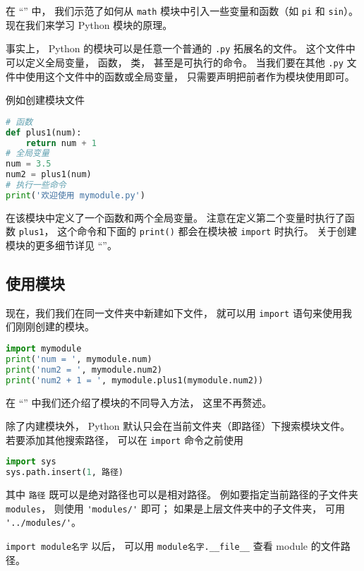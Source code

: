 

在 “” 中， 我们示范了如何从 \verb`math` 模块中引入一些变量和函数（如 \verb`pi` 和 \verb`sin`）。 现在我们来学习 Python 模块的原理。

事实上， Python 的模块可以是任意一个普通的 \verb`.py` 拓展名的文件。 这个文件中可以定义全局变量， 函数， 类， 甚至是可执行的命令。 当我们要在其他 \verb`.py` 文件中使用这个文件中的函数或全局变量， 只需要声明把前者作为模块使用即可。

例如创建模块文件
\begin{lstlisting}[language=python,caption=mymodule.py]
# 函数
def plus1(num):
    return num + 1
# 全局变量
num = 3.5
num2 = plus1(num)
# 执行一些命令
print('欢迎使用 mymodule.py')
\end{lstlisting}
在该模块中定义了一个函数和两个全局变量。 注意在定义第二个变量时执行了函数 \verb`plus1`， 这个命令和下面的 \verb`print()` 都会在模块被 \verb`import` 时执行。 关于创建模块的更多细节详见 “”。

\subsection{使用模块}
现在，我们我们在同一文件夹中新建如下文件， 就可以用 \verb`import` 语句来使用我们刚刚创建的模块。
\begin{lstlisting}[language=python,caption=test.py]
import mymodule
print('num = ', mymodule.num)
print('num2 = ', mymodule.num2)
print('num2 + 1 = ', mymodule.plus1(mymodule.num2))
\end{lstlisting}
在 “” 中我们还介绍了模块的不同导入方法， 这里不再赘述。

除了内建模块外， Python 默认只会在当前文件夹（即路径）下搜索模块文件。 若要添加其他搜索路径， 可以在 \verb`import` 命令之前使用
\begin{lstlisting}[language=python]
import sys
sys.path.insert(1, 路径)
\end{lstlisting}
其中 \verb`路径` 既可以是绝对路径也可以是相对路径。 %
例如要指定当前路径的子文件夹 \verb`modules`， 则使用 \verb`'modules/'` 即可； 如果是上层文件夹中的子文件夹， 可用 \verb`'../modules/'`。

\verb`import module名字` 以后， 可以用 \verb`module名字.__file__` 查看 module 的文件路径。

